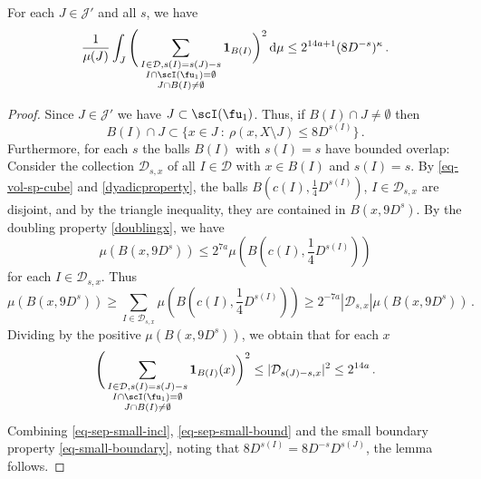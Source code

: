     \begin{lemma}
        \label{square-function-count}
        \leanok
        For each $J \in \mathcal{J}'$ and all $s$, we have
        $$
            \frac{1}{\mu(J)} \int_J \Bigg(\sum_{\substack{I \in \mathcal{D}, s(I) = s(J) - s\\ I \cap \scI(\fu_1) = \emptyset\\
        J \cap B(I) \ne \emptyset}} \mathbf{1}_{B(I)}\bigg)^2 \, \mathrm{d}\mu \le 2^{14a+1} (8 D^{-s})^\kappa\,.
        $$
    \end{lemma}

    \begin{proof}
        \leanok
        Since $J \in \mathcal{J}'$ we have $J \subset \scI(\fu_1)$. Thus, if $B(I) \cap J \ne \emptyset$ then
    \begin{equation}
        \label{eq-sep-small-incl}
        B(I) \cap J \subset \{x \in J \ : \ \rho(x, X \setminus J) \le 8D^{s(I)}\}\,.
    \end{equation}
    Furthermore, for each $s$ the balls $B(I)$ with $s(I) = s$ have bounded overlap: Consider the collection $\mathcal{D}_{s,x}$ of all $I \in \mathcal{D}$ with $x \in B(I)$ and $s(I) = s$. By \eqref{eq-vol-sp-cube} and \eqref{dyadicproperty}, the balls $B(c(I), \frac{1}{4} D^{s(I)})$, $I \in \mathcal{D}_{s,x}$ are disjoint, and by the triangle inequality, they are contained in $B(x, 9 D^{s})$. By the doubling property \eqref{doublingx}, we have
    $$
        \mu(B(x, 9D^{s})) \le 2^{7a} \mu(B(c(I), \frac{1}{4} D^{s(I)}))
    $$
    for each $I \in \mathcal{D}_{s,x}$.
    Thus
    $$
        \mu(B(x, 9D^{s})) \ge \sum_{I \in \mathcal{D}_{s,x}} \mu(B(c(I), \frac{1}{4} D^{s(I)})) \ge 2^{-7a} |\mathcal{D}_{s,x}| \mu(B(x, 9D^{s}))\,.
    $$
    Dividing by the positive $\mu(B(x, 9D^{s}))$, we obtain that for each $x$
    \begin{equation}
        \label{eq-sep-small-bound}
        \Bigg(\sum_{\substack{I \in \mathcal{D}, s(I) = s(J) - s\\ I \cap \scI(\fu_1) = \emptyset\\
        J \cap B(I) \ne \emptyset}} \mathbf{1}_{B(I)}(x) \bigg)^2 \le |\mathcal{D}_{s(J) - s,x}|^2 \le 2^{14a} \,.
    \end{equation}
    Combining \eqref{eq-sep-small-incl}, \eqref{eq-sep-small-bound} and the small boundary property \eqref{eq-small-boundary}, noting that $8D^{s(I)}=8D^{-s}D^{s(J)}$, the lemma follows.
\end{proof}


